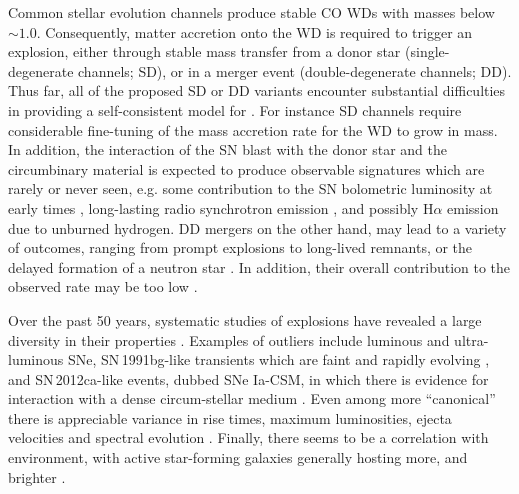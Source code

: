 \documentclass[twocolumn,tighten,times]{aastex62}
\begin{document}
Common stellar evolution channels produce stable CO WDs 
with masses below $\sim 1.0$\msun. 
Consequently, matter accretion onto the WD is required to trigger an 
explosion, either through stable mass transfer from a 
donor star (single-degenerate channels; SD), or in a 
merger event (double-degenerate channels; DD).  
Thus far, all of the proposed SD or DD variants    
encounter substantial difficulties in providing 
a self-consistent model for \ias \citep{Livio:2018rue}. 
For instance SD channels require considerable fine-tuning 
of the mass accretion rate for
the WD to grow in mass. In addition, the interaction of 
the SN blast  with the donor 
star and the circumbinary material is expected to produce 
observable signatures which 
are rarely or never seen, e.g. some contribution to the SN bolometric luminosity 
at early times \citep{Kasen:2009si}, long-lasting radio synchrotron emission 
\citep{Harris:2016hfr}, and possibly H$\alpha$ emission due to unburned hydrogen. 
DD mergers on the other hand, may lead to a variety of outcomes, 
ranging from prompt 
explosions to long-lived remnants, or the delayed formation of a neutron star 
\citep{Livio:2018rue}. In addition, their overall contribution to the observed \ia rate may be too low \citep{vanKerkwijk:2010he,Sato:2015spa}. 


Over the past 50 years, systematic studies of \ia explosions have revealed a large
diversity in their properties \citep{kirshner1973}. 
Examples of  outliers include luminous 
\citep[e.g. SN\,1991T;][]{filippenko1992} and ultra-luminous  
\citep[e.g. SNLS-03D3bb;][]{Howell:2006vn} SNe, SN\,1991bg-like transients which 
are faint and rapidly evolving \citep{ruiz-lapuente1993},  
and SN\,2012ca-like events, dubbed SNe Ia-CSM, in which 
there is evidence for interaction with a dense circum-stellar 
medium \citep{Bochenek:2017vok}. 
Even among more ``canonical'' \ias there is appreciable
variance in rise times, maximum luminosities, ejecta velocities and spectral evolution   
\citep[][]{Mazzali:2007et,Livio:2018rue}. 
Finally, there seems to be a correlation with environment, 
with active star-forming galaxies generally  hosting more, and brighter \ias \citep{Pritchet:2008np}. 
\end{document}
